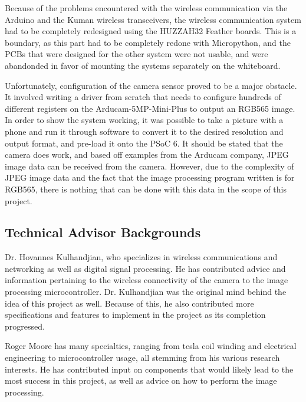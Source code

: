 \setlength{\parindent}{2.5ex} Because of the problems encountered with the wireless communication via the Arduino and the Kuman wireless transceivers, the wireless communication system had to be completely redesigned using the HUZZAH32 Feather boards. This is a boundary, as this part had to be completely redone with Micropython, and the PCBs that were designed for the other system were not usable, and were abandonded in favor of mounting the systems separately on the whiteboard. \par
\setlength{\parindent}{2.5ex}
Unfortunately, configuration of the camera sensor proved to be a major obstacle. It involved writing a driver from scratch that needs to configure hundreds of different registers on the Arducam-5MP-Mini-Plus to output an RGB565 image. In order to show the system working, it was possible to take a picture with a phone and run it through software to convert it to the desired resolution and output format, and pre-load it onto the PSoC 6. It should be stated that the camera does work, and based off examples from the Arducam company, JPEG image data can be received from the camera. However, due to the complexity of JPEG image data and the fact that the image processing program written is for RGB565, there is nothing that can be done with this data in the scope of this project.

\subsection{Technical Advisor Backgrounds} \par	
\setlength{\parindent}{2.5ex} Dr. Hovannes Kulhandjian, who specializes in wireless communications and networking as well as digital signal processing. He has contributed advice and information pertaining to the wireless connectivity of the camera to the image processing microcontroller. Dr. Kulhandjian was the original mind behind the idea of this project as well. Because of this, he also contributed more specifications and features to implement in the project as its completion progressed.\par
\setlength{\parindent}{2.5ex}
Roger Moore has many specialties, ranging from tesla coil winding and electrical engineering to microcontroller usage, all stemming from his various research interests. He has contributed input on components that would likely lead to the most success in this project, as well as advice on how to perform the image processing.

